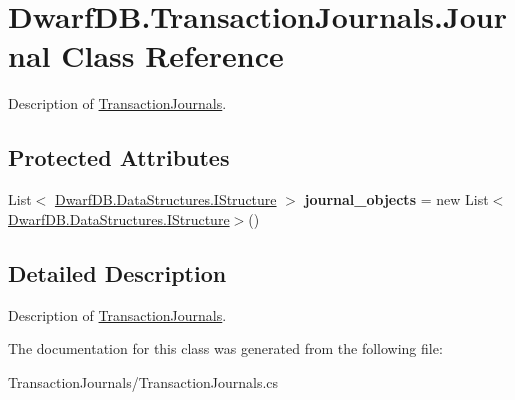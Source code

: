 \hypertarget{class_dwarf_d_b_1_1_transaction_journals_1_1_journal}{
\section{DwarfDB.TransactionJournals.Journal Class Reference}
\label{class_dwarf_d_b_1_1_transaction_journals_1_1_journal}
}


Description of \hyperlink{namespace_dwarf_d_b_1_1_transaction_journals}{TransactionJournals}.  


\subsection*{Protected Attributes}
\begin{DoxyCompactItemize}
\item 
\hypertarget{class_dwarf_d_b_1_1_transaction_journals_1_1_journal_a804e9cfa2c0d03cc2b4ec5ffc1b25bf6}{
List$<$ \hyperlink{interface_dwarf_d_b_1_1_data_structures_1_1_i_structure}{DwarfDB.DataStructures.IStructure} $>$ {\bfseries journal\_\-objects} = new List$<$\hyperlink{interface_dwarf_d_b_1_1_data_structures_1_1_i_structure}{DwarfDB.DataStructures.IStructure}$>$()}
\label{class_dwarf_d_b_1_1_transaction_journals_1_1_journal_a804e9cfa2c0d03cc2b4ec5ffc1b25bf6}

\end{DoxyCompactItemize}


\subsection{Detailed Description}
Description of \hyperlink{namespace_dwarf_d_b_1_1_transaction_journals}{TransactionJournals}. 

The documentation for this class was generated from the following file:\begin{DoxyCompactItemize}
\item 
TransactionJournals/TransactionJournals.cs\end{DoxyCompactItemize}
